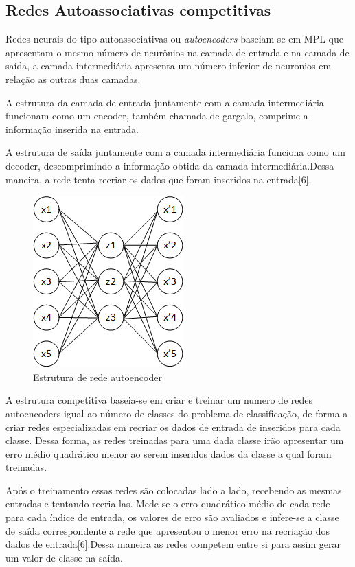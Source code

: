 \subsection{Redes Autoassociativas competitivas}
Redes neurais do tipo autoassociativas ou \textit{autoencoders} baseiam-se em MPL que apresentam o mesmo número de neurônios na camada de entrada e na camada de saída, a camada intermediária apresenta um número inferior de neuronios em relação as outras duas camadas. 

A estrutura da camada de entrada juntamente com a camada intermediária funcionam como um encoder, também chamada de gargalo, comprime a informação inserida na entrada. 

A estrutura de saída juntamente com a camada intermediária funciona como um decoder, descomprimindo a informação obtida da camada intermediária.Dessa maneira, a rede  tenta recriar os dados que foram inseridos na entrada[6].
\begin{figure}[H]

\centering %
\includegraphics{04-Figuras/autoencoder}
\caption{Estrutura de rede autoencoder}

\label{figura:arquitetura}

\end{figure}

A estrutura competitiva baseia-se em criar e treinar um numero de redes autoencoders igual ao número de classes do problema de classificação, de forma a criar redes especializadas em recriar os dados de entrada de inseridos para cada classe. Dessa forma, as redes treinadas para uma dada classe irão apresentar um erro médio quadrático menor ao serem inseridos dados da classe a qual foram treinadas.

Após o treinamento essas redes são colocadas lado a lado, recebendo as mesmas entradas e tentando recria-las. Mede-se o erro quadrático médio de cada rede para cada índice de entrada, os valores de erro são avaliados e infere-se a classe de saída correspondente a rede que apresentou o menor erro na recriação dos dados de entrada[6].Dessa maneira as redes competem entre si para assim gerar um valor de classe na saída.


